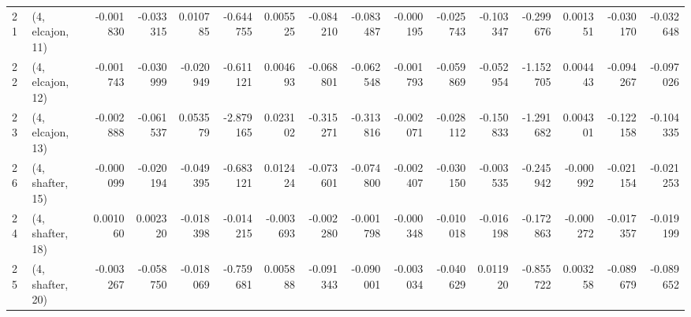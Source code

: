 \begin{tabular}{llrrrrrrrrrrrrrr}
21 &  (4, elcajon, 11) &  -0.001830 & -0.033315 &  0.010785 &  -0.644755 &  0.005525 &  -0.084210 & -0.083487 & -0.000195 & -0.025743 & -0.103347 &  -0.299676 &  0.001351 & -0.030170 & -0.032648 \\
22 &  (4, elcajon, 12) &  -0.001743 & -0.030999 & -0.020949 &  -0.611121 &  0.004693 &  -0.068801 & -0.062548 & -0.001793 & -0.059869 & -0.052954 &  -1.152705 &  0.004443 & -0.094267 & -0.097026 \\
23 &  (4, elcajon, 13) &  -0.002888 & -0.061537 &  0.053579 &  -2.879165 &  0.023102 &  -0.315271 & -0.313816 & -0.002071 & -0.028112 & -0.150833 &  -1.291682 &  0.004301 & -0.122158 & -0.104335 \\
26 &  (4, shafter, 15) &  -0.000099 & -0.020194 & -0.049395 &  -0.683121 &  0.012424 &  -0.073601 & -0.074800 & -0.002407 & -0.030150 & -0.003535 &  -0.245942 & -0.000992 & -0.021154 & -0.021253 \\
24 &  (4, shafter, 18) &   0.001060 &  0.002320 & -0.018398 &  -0.014215 & -0.003693 &  -0.002280 & -0.001798 & -0.000348 & -0.010018 & -0.016198 &  -0.172863 & -0.000272 & -0.017357 & -0.019199 \\
25 &  (4, shafter, 20) &  -0.003267 & -0.058750 & -0.018069 &  -0.759681 &  0.005888 &  -0.091343 & -0.090001 & -0.003034 & -0.040629 &  0.011920 &  -0.855722 &  0.003258 & -0.089679 & -0.089652 \\
\bottomrule
\end{tabular}
